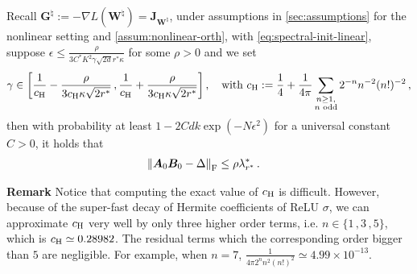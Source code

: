 \begin{lemma}
\label{A0B0-init-risk}
    Recall $\bm G^\natural:=-\nabla L(\bm W^\natural)=\bm J_{\bm W^\natural}$, under assumptions in \cref{sec:assumptions} for the nonlinear setting and \cref{assum:nonlinear-orth}, with \eqref{eq:spectral-init-linear}, suppose $\epsilon \leq \frac{\rho}{3C^*K^2\gamma\sqrt{2d}r^*\kappa}$ for some $\rho>0$ and we set
    \begin{equation}\label{G-concen-err}
       \gamma\in\left[\frac{1}{c_{\rm H}}-\frac{\rho}{3c_{\rm H}\kappa\sqrt{2r^*}}\,,\frac{1}{c_{\rm H}}+\frac{\rho}{3c_{\rm H}\kappa\sqrt{2r^*}}\right], \quad \mbox{with}~ c_{\rm H} :=\frac{1}{4} + \frac{1}{4\pi}\sum_{\substack{n\geq 1, \\ n \text{ odd}}} 2^{-n} n^{-2} (n!)^{-2}\,,
    \end{equation}
    then with probability at least $1-2Cdk\operatorname{exp}(-N\epsilon^2)$ for a universal constant $C>0$, it holds that
    \begin{align*}
        \left\|\bm A_0 \bm B_0 - \Delta\right\|_{\rm F} & \leq \rho\lambda^*_{r^*}\,.
    \end{align*}
\end{lemma}
{\bf Remark} Notice that computing the exact value of $c_{\rm H}$ is difficult. However, because of the super-fast decay of Hermite coefficients of ReLU $\sigma$, we can approximate $c_{\rm H}$ very well by only three higher order terms, i.e. $n\in\{1\,,3\,,5\}$, which is $c_{\rm H}\simeq 0.28982$. The residual terms which the corresponding order bigger than $5$ are negligible. For example, when $n=7$, $\frac{1}{4\pi2^{n} n^{2} (n!)^{2}}\simeq 4.99\times 10^{-13}$.
